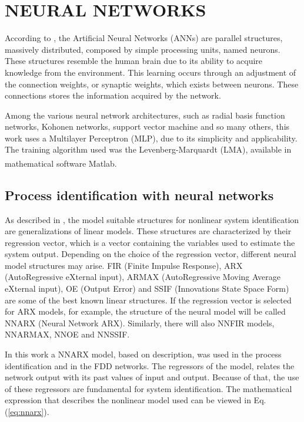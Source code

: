 \documentclass[10pt,fleqn,a4paper]{article}
\newcommand{\reg}{\textsuperscript{\textregistered}}
\begin{document}
\section{NEURAL NETWORKS}\label{sec:ann}
According to \citet{haykin:2000}, the Artificial Neural Networks (ANNs) are
parallel structures, massively distributed, composed by simple processing units,
named neurons. These structures resemble the human brain due to its ability to
acquire knowledge from the environment. This learning occurs through an
adjustment of the connection weights, or synaptic weights, which exists between
neurons. These connections stores the information acquired by the network.

Among the various neural network architectures, such as radial basis function
networks, Kohonen networks, support vector machine and so many others, this work
uses a Multilayer Perceptron (MLP), due to its simplicity and applicability.
The training algorithm used was the Levenberg-Marquardt (LMA), available in
mathematical software Matlab\reg.

\subsection{Process identification with neural networks}
As described in \citet{lucena:2005}, the model suitable structures for nonlinear
system identification are generalizations of linear models. These structures are
characterized by their regression vector, which is a vector containing the
variables used to estimate the system output. Depending on the choice of the
regression vector, different neural model structures may arise.  FIR (Finite
Impulse Response), ARX (AutoRegressive eXternal input), ARMAX (AutoRegressive
Moving Average eXternal input), OE (Output Error) and SSIF (Innovations State
Space Form) are some of the best known linear structures. If the regression
vector is selected for ARX models, for example, the structure of the neural
model will be called NNARX (Neural Network ARX). Similarly, there will also
NNFIR models, NNARMAX, NNOE and NNSSIF.

In this work a NNARX model, based on \citet{norgaard:2000} description, was used
in the process identification and in the FDD networks. The regressors of the
model, relates the network output with its past values of input and output.
Because of that, the use of these regressors are fundamental for system
identification. The mathematical expression that describes the nonlinear model
used can be viewed in Eq. (\ref{eq:nnarx}).
\end{document}
